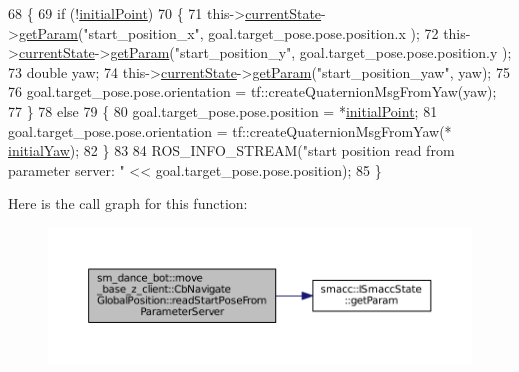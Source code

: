 \begin{DoxyCode}
68   \{
69     \textcolor{keywordflow}{if} (!\hyperlink{classsm__dance__bot_1_1move__base__z__client_1_1CbNavigateGlobalPosition_a7e8224311686be554d68853ff757be5d}{initialPoint})
70     \{
71       this->\hyperlink{classsmacc_1_1SmaccClientBehavior_af76fc9b877542ed5caf033f820c107d0}{currentState}->\hyperlink{classsmacc_1_1ISmaccState_abbb3a24b912c6e8de28f7b86123b6357}{getParam}(\textcolor{stringliteral}{"start\_position\_x"}, goal.target\_pose.pose.position.x
      );
72       this->\hyperlink{classsmacc_1_1SmaccClientBehavior_af76fc9b877542ed5caf033f820c107d0}{currentState}->\hyperlink{classsmacc_1_1ISmaccState_abbb3a24b912c6e8de28f7b86123b6357}{getParam}(\textcolor{stringliteral}{"start\_position\_y"}, goal.target\_pose.pose.position.y
      );
73       \textcolor{keywordtype}{double} yaw;
74       this->\hyperlink{classsmacc_1_1SmaccClientBehavior_af76fc9b877542ed5caf033f820c107d0}{currentState}->\hyperlink{classsmacc_1_1ISmaccState_abbb3a24b912c6e8de28f7b86123b6357}{getParam}(\textcolor{stringliteral}{"start\_position\_yaw"}, yaw);
75 
76       goal.target\_pose.pose.orientation = tf::createQuaternionMsgFromYaw(yaw);
77     \}
78     \textcolor{keywordflow}{else}
79     \{
80       goal.target\_pose.pose.position = *\hyperlink{classsm__dance__bot_1_1move__base__z__client_1_1CbNavigateGlobalPosition_a7e8224311686be554d68853ff757be5d}{initialPoint};
81       goal.target\_pose.pose.orientation = tf::createQuaternionMsgFromYaw(*
      \hyperlink{classsm__dance__bot_1_1move__base__z__client_1_1CbNavigateGlobalPosition_a2466eeabb6e2a3f35427a444a369d45e}{initialYaw});
82     \}
83 
84     ROS\_INFO\_STREAM(\textcolor{stringliteral}{"start position read from parameter server: "} << goal.target\_pose.pose.position);
85   \}
\end{DoxyCode}


Here is the call graph for this function\+:
\nopagebreak
\begin{figure}[H]
\begin{center}
\leavevmode
\includegraphics[width=350pt]{classsm__dance__bot_1_1move__base__z__client_1_1CbNavigateGlobalPosition_a79dc46f7a60a0322d27ee4db0ab11ad7_cgraph}
\end{center}
\end{figure}




